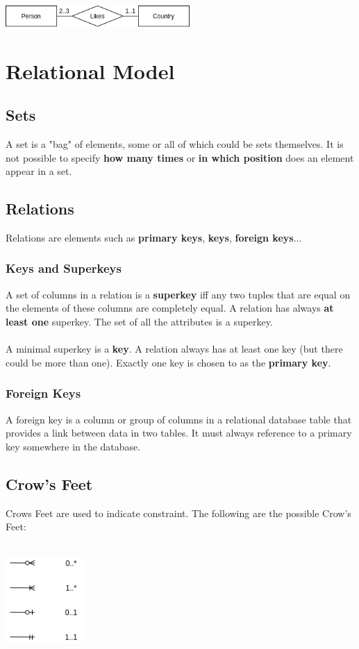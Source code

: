 \documentclass{article}
\begin{document}
\vspace{.6cm}
\centerline{\includegraphics[width=7cm]{./assets/look-across.png}}
\vspace{.2cm}

\section{Relational Model}
\subsection{Sets}
A set is a "bag" of elements, some or all of which could be sets themselves. It is not possible to specify \textbf{how many times} or \textbf{in which position} does an element appear in a set.

\subsection{Relations}
Relations are elements such as \textbf{primary keys}, \textbf{keys}, \textbf{foreign keys}...

\subsubsection{Keys and Superkeys}
A set of columns in a relation is a \textbf{superkey} iff any two tuples that are equal on the elements of these columns are completely equal. A relation has always \textbf{at least one} superkey. The set of all the attributes is a superkey. \\ \\
A minimal superkey is a \textbf{key}. A relation always has at least one key (but there could be more than one). Exactly one key is chosen to as the \textbf{primary key}.

\subsubsection{Foreign Keys}
A foreign key is a column or group of columns in a relational database table that provides a link between data in two tables. It must always reference to a primary key somewhere in the database.

\subsection{Crow's Feet}
Crows Feet are used to indicate constraint. The following are the possible Crow's Feet: \\ \\

\centerline{\includegraphics[width=3cm]{./assets/crows.png}}
\end{document}
